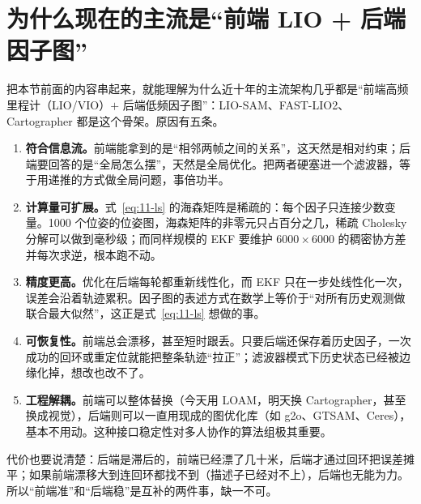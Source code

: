 \section{为什么现在的主流是``前端 LIO + 后端因子图''}\label{sec:11-why-opt}

把本节前面的内容串起来，就能理解为什么近十年的主流架构几乎都是``前端高频里程计（LIO/VIO）$+$ 后端低频因子图''：LIO-SAM\cite{shan2020liosam}、FAST-LIO2\cite{xu2022fastlio2}、Cartographer\cite{hess2016cartographer} 都是这个骨架。原因有五条。

\begin{enumerate}
  \item \textbf{符合信息流。}前端能拿到的是``相邻两帧之间的关系''，这天然是相对约束；后端要回答的是``全局怎么摆''，天然是全局优化。把两者硬塞进一个滤波器，等于用递推的方式做全局问题，事倍功半。
  \item \textbf{计算量可扩展。}式~\eqref{eq:11-ls} 的海森矩阵是稀疏的：每个因子只连接少数变量。1000 个位姿的位姿图，海森矩阵的非零元只占百分之几，稀疏 Cholesky 分解可以做到毫秒级；而同样规模的 EKF 要维护 $6000\times6000$ 的稠密协方差并每次求逆\cite{kummerle2011g2o}，根本跑不动。
  \item \textbf{精度更高。}优化在后端每轮都重新线性化，而 EKF 只在一步处线性化一次，误差会沿着轨迹累积。因子图的表述方式在数学上等价于``对所有历史观测做联合最大似然''，这正是式~\eqref{eq:11-ls} 想做的事\cite{dellaert2017factorgraphs}。
  \item \textbf{可恢复性。}前端总会漂移，甚至短时跟丢。只要后端还保存着历史因子，一次成功的回环或重定位就能把整条轨迹``拉正''；滤波器模式下历史状态已经被边缘化掉，想改也改不了。
  \item \textbf{工程解耦。}前端可以整体替换（今天用 LOAM，明天换 Cartographer，甚至换成视觉），后端则可以一直用现成的图优化库（如 g2o、GTSAM、Ceres\cite{kummerle2011g2o}），基本不用动。这种接口稳定性对多人协作的算法组极其重要。
\end{enumerate}

代价也要说清楚：后端是滞后的，前端已经漂了几十米，后端才通过回环把误差摊平；如果前端漂移大到连回环都找不到（描述子已经对不上），后端也无能为力。所以``前端准''和``后端稳''是互补的两件事，缺一不可。

